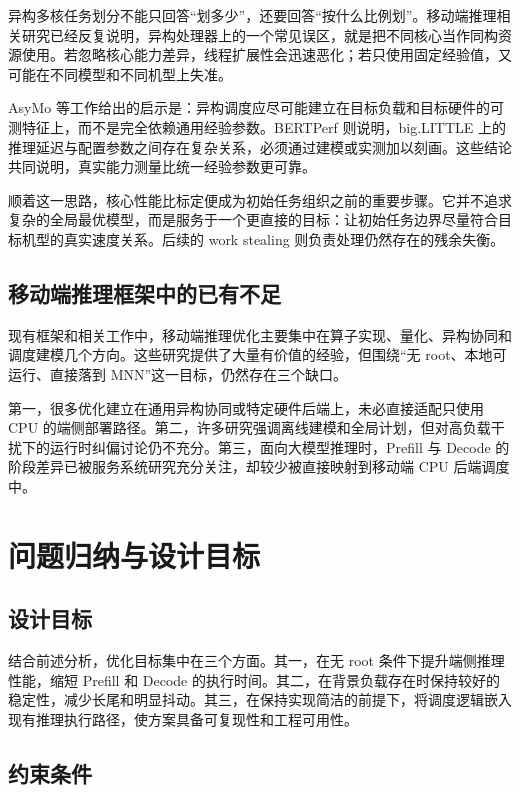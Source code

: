 异构多核任务划分不能只回答“划多少”，还要回答“按什么比例划”。移动端推理相关研究已经反复说明，异构处理器上的一个常见误区，就是把不同核心当作同构资源使用\cite{wang2021asymo,liu2024pitfalls}。若忽略核心能力差异，线程扩展性会迅速恶化；若只使用固定经验值，又可能在不同模型和不同机型上失准。

AsyMo 等工作给出的启示是：异构调度应尽可能建立在目标负载和目标硬件的可测特征上，而不是完全依赖通用经验参数\cite{wang2021asymo}。BERTPerf 则说明，big.LITTLE 上的推理延迟与配置参数之间存在复杂关系，必须通过建模或实测加以刻画\cite{abdelgawad2022bertperf}。这些结论共同说明，真实能力测量比统一经验参数更可靠。

顺着这一思路，核心性能比标定便成为初始任务组织之前的重要步骤。它并不追求复杂的全局最优模型，而是服务于一个更直接的目标：让初始任务边界尽量符合目标机型的真实速度关系。后续的 work stealing 则负责处理仍然存在的残余失衡。

\subsection{移动端推理框架中的已有不足}

现有框架和相关工作中，移动端推理优化主要集中在算子实现、量化、异构协同和调度建模几个方向\cite{jia2022codl,xu2021coschedule,niu2024smartmem}。这些研究提供了大量有价值的经验，但围绕“无 root、本地可运行、直接落到 MNN”这一目标，仍然存在三个缺口。

第一，很多优化建立在通用异构协同或特定硬件后端上，未必直接适配只使用 CPU 的端侧部署路径。第二，许多研究强调离线建模和全局计划，但对高负载干扰下的运行时纠偏讨论仍不充分。第三，面向大模型推理时，Prefill 与 Decode 的阶段差异已被服务系统研究充分关注，却较少被直接映射到移动端 CPU 后端调度中。

\section{问题归纳与设计目标}

\subsection{设计目标}

结合前述分析，优化目标集中在三个方面。其一，在无 root 条件下提升端侧推理性能，缩短 Prefill 和 Decode 的执行时间。其二，在背景负载存在时保持较好的稳定性，减少长尾和明显抖动。其三，在保持实现简洁的前提下，将调度逻辑嵌入现有推理执行路径，使方案具备可复现性和工程可用性。

\subsection{约束条件}

